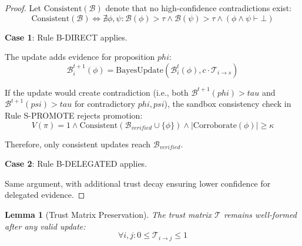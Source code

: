 \documentclass[
]{article}
\newtheorem{lemma}[theorem]{Lemma}
\begin{document}
\begin{proof}
Let $\text{Consistent}(\mathcal{B})$ denote that no high-confidence contradictions exist:
\begin{equation}
\label{eq:consistency-def}
\text{Consistent}(\mathcal{B}) \iff \nexists \phi, \psi: \mathcal{B}(\phi) > \tau \land \mathcal{B}(\psi) > \tau \land (\phi \land \psi \vdash \bot)
\end{equation}

\textbf{Case 1}: Rule B-DIRECT applies.

The update adds evidence for proposition $phi$:
\begin{equation}
\label{eq:direct-update}
\mathcal{B}_i^{t+1}(\phi) = \text{BayesUpdate}(\mathcal{B}_i^t(\phi), c \cdot \mathcal{T}_{i \to s})
\end{equation}

If the update would create contradiction (i.e., both $\mathcal{B}^{t+1}(phi) > tau$ and $\mathcal{B}^{t+1}(psi) > tau$ for contradictory $phi, psi$), the sandbox consistency check in Rule S-PROMOTE rejects promotion:
\begin{equation}
\label{eq:promote-condition}
V(\pi) = 1 \land \text{Consistent}(\mathcal{B}_{verified} \cup \{\phi\}) \land |\text{Corroborate}(\phi)| \geq \kappa
\end{equation}

Therefore, only consistent updates reach $\mathcal{B}_{verified}$.

\textbf{Case 2}: Rule B-DELEGATED applies.

Same argument, with additional trust decay ensuring lower confidence for delegated evidence.
\end{proof}

\begin{lemma}[Trust Matrix Preservation]
\label{lem:trust-preservation}
The trust matrix $\mathcal{T}$ remains well-formed after any valid update:
\begin{equation}
\label{eq:trust-wellformed}
\forall i, j: 0 \leq \mathcal{T}_{i \to j} \leq 1
\end{equation}
\end{lemma}
\end{document}
